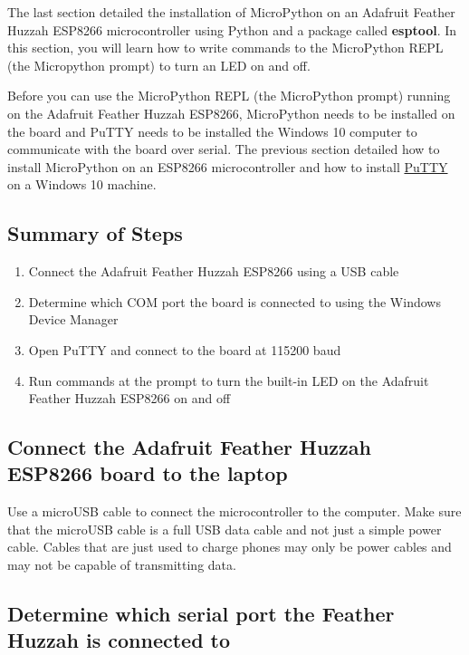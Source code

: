\documentclass{book}
\providecommand{\tightlist}{%
      \setlength{\itemsep}{0pt}\setlength{\parskip}{0pt}}
\begin{document}
    The last section detailed the installation of MicroPython on an Adafruit
Feather Huzzah ESP8266 microcontroller using Python and a package called
\textbf{esptool}. In this section, you will learn how to write commands
to the MicroPython REPL (the Micropython prompt) to turn an LED on and
off.

Before you can use the MicroPython REPL (the MicroPython prompt) running
on the Adafruit Feather Huzzah ESP8266, MicroPython needs to be
installed on the board and PuTTY needs to be installed the Windows 10
computer to communicate with the board over serial. The previous section
detailed how to install MicroPython on an ESP8266 microcontroller and
how to install \href{https://www.putty.org/}{PuTTY} on a Windows 10
machine.

    \subsection{Summary of Steps}\label{summary-of-steps}

    \begin{enumerate}
\def\labelenumi{\arabic{enumi}.}
\tightlist
\item
  Connect the Adafruit Feather Huzzah ESP8266 using a USB cable
\item
  Determine which COM port the board is connected to using the Windows
  Device Manager
\item
  Open PuTTY and connect to the board at 115200 baud
\item
  Run commands at the prompt to turn the built-in LED on the Adafruit
  Feather Huzzah ESP8266 on and off
\end{enumerate}

    \subsection{Connect the Adafruit Feather Huzzah ESP8266 board to the
laptop}\label{connect-the-adafruit-feather-huzzah-esp8266-board-to-the-laptop}

    Use a microUSB cable to connect the microcontroller to the computer.
Make sure that the microUSB cable is a full USB data cable and not just
a simple power cable. Cables that are just used to charge phones may
only be power cables and may not be capable of transmitting data.

    \subsection{Determine which serial port the Feather Huzzah is connected
to}\label{determine-which-serial-port-the-feather-huzzah-is-connected-to}
\end{document}
